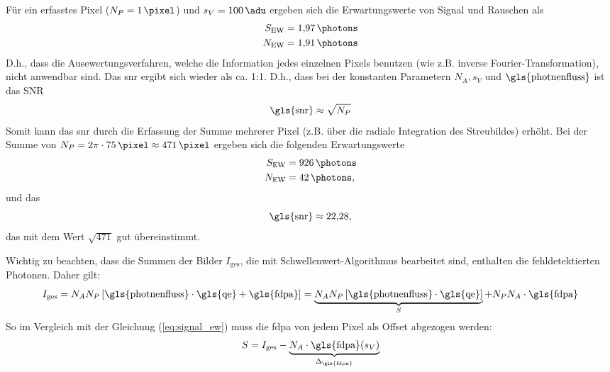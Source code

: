 \noindent
Für ein erfasstes Pixel ($N_P = \SI{1}{\pixel}$) und $s_V = \SI{100}{\adu}$ ergeben sich die Erwartungswerte von Signal und Rauschen als
\begin{equation}
    \begin{split}
        S_\text{EW} &= \SI{1.97}{\photons}\\
        N_\text{EW} &= \SI{1.91}{\photons}\\
    \end{split}
\end{equation}
\noindent
D.h., dass die Ausewertungsverfahren, welche die Information jedes einzelnen Pixels benutzen (wie z.B. inverse Fourier-Transformation), nicht anwendbar sind. Das \gls{snr} ergibt sich wieder als ca. 1:1. D.h., dass bei der konstanten Parametern $N_A, s_V$ und $\text{\gls{photnenfluss}}$ ist das SNR
\begin{equation}
    \text{\gls{snr}} \approx \sqrt{N_P}
\end{equation}
\noindent
Somit kann das \gls{snr} durch die Erfassung der Summe mehrerer Pixel (z.B. über die radiale Integration des Streubildes) erhöht. Bei der Summe von $N_P = 2\pi\cdot\SI{75}{\pixel} \approx \SI{471}{\pixel}$ ergeben sich die folgenden Erwartungswerte
\begin{equation}
    \begin{split}
        S_\text{EW} &= \SI{926}{\photons}\\
        N_\text{EW} &= \SI{42}{\photons},
    \end{split}
\end{equation}
und das 
\begin{equation}
    \text{\gls{snr}} \approx \num{22.28},
\end{equation}
\noindent
das mit dem Wert $\sqrt{471}$ gut übereinstimmt.

\noindent
Wichtig zu beachten, dass die Summen der Bilder $I_\text{ges}$, die  mit Schwellenwert-Algorithmus bearbeitet sind, enthalten die fehldetektierten Photonen. Daher gilt:
\begin{equation}
    I_\text{ges} = N_A N_P \left[\text{\gls{photnenfluss}}\cdot \text{\gls{qe}} + \text{\gls{fdpa}}\right] = \underbrace{N_A N_P \left[\text{\gls{photnenfluss}}\cdot \text{\gls{qe}}\right]}_{S} + N_P N_A\cdot\text{\gls{fdpa}}
\end{equation}
So im Vergleich mit der Gleichung (\ref{eq:signal_ew}) muss die \gls{fdpa} von jedem Pixel als Offset abgezogen werden:
\begin{equation}
    S = I_\text{ges} - \underbrace{N_A\cdot\text{\gls{fdpa}}(s_V)}_{\Delta_\text{\gls{fdpa}}}
    \label{eq:signal_int_fpda}
\end{equation}

